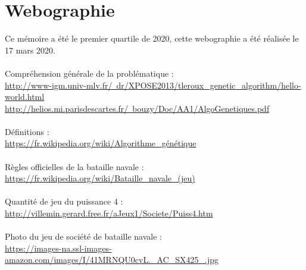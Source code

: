 \documentclass[12pt]{report}
\begin{document}
\section{Webographie}
Ce mémoire a été le premier quartile de 2020, cette webographie a été réalisée le 17 mars 2020.\\
\\
Compréhension générale de la problématique : \\
\href{http://www-igm.univ-mlv.fr/~dr/XPOSE2013/tleroux\_genetic\_algorithm/hello-world.html}{http://www-igm.univ-mlv.fr/~dr/XPOSE2013/tleroux\_genetic\_algorithm/hello-world.html}\\
\href{http://helios.mi.parisdescartes.fr/~bouzy/Doc/AA1/AlgoGenetiques.pdf}{http://helios.mi.parisdescartes.fr/~bouzy/Doc/AA1/AlgoGenetiques.pdf}\\
\\
Définitions :\\
\href{https://fr.wikipedia.org/wiki/Algorithme\_g\%C3\%A9n\%C3\%A9tique}{https://fr.wikipedia.org/wiki/Algorithme\_génétique}\\\\
Règles officielles de la bataille navale :\\
\href{https://fr.wikipedia.org/wiki/Bataille_navale_(jeu)}{https://fr.wikipedia.org/wiki/Bataille\_navale\_(jeu)}\\\\
Quantité de jeu du puissance 4 : \\
\href{http://villemin.gerard.free.fr/aJeux1/Societe/Puiss4.htm}{http://villemin.gerard.free.fr/aJeux1/Societe/Puiss4.htm}\\\\
Photo du jeu de société de bataille navale :\\
\href{https://images-na.ssl-images-amazon.com/images/I/41MRNQU0cvL.\_AC\_SX425\_.jpg}{https://images-na.ssl-images-amazon.com/images/I/41MRNQU0cvL.\_AC\_SX425\_.jpg}\\\\
\end{document}
